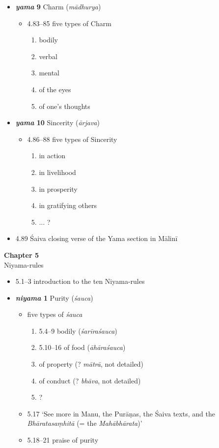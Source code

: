 \documentclass[11pt]{book} %
\newcommand{\skt}[1]{\textit{#1}}
\begin{document}
\begin{itemize}
\item \textbf{\skt{yama} 9}  Charm (\skt{mādhurya})
\begin{itemize}
\item 4.83--85 five types of Charm
            \begin{enumerate}
            \item bodily
            \item verbal
            \item mental
            \item of the eyes
            \item of one's thoughts
            \end{enumerate}
\end{itemize}

\item \textbf{\skt{yama} 10}  Sincerity (\skt{ārjava})
\begin{itemize}
\item 4.86--88 five types of Sincerity
            \begin{enumerate}
            \item in action
            \item in livelihood
            \item in prosperity
            \item in gratifying others
            \item ... ?
            \end{enumerate}
\end{itemize}
\item 4.89 Śaiva closing verse of the Yama section in Mālinī
\end{itemize}

\bigskip
 \textbf{Chapter 5}\\
  Niyama-rules  
\begin{itemize}
\item 5.1--3 introduction to the ten Niyama-rules
\item \textbf{\skt{niyama} 1}  Purity (\skt{śauca})
   \begin{itemize}
    \item  five types of \skt{śauca}
    \begin{enumerate}
    \item 5.4--9 bodily (\skt{śarīraśauca})
    \item 5.10--16 of food (\skt{āhāraśauca})
    \item of property (? \skt{mātrā}, not detailed)
    \item of conduct (? \skt{bhāva}, not detailed)
    \item ?
    \end{enumerate}
    \item 5.17 `See more in Manu, the Purāṇas, the Śaiva texts, and the \textit{Bhāratasaṃhitā} (= the  \textit{Mahābhārata})'
    \item 5.18--21 praise of purity
    \end{itemize}
\end{itemize}
\end{document}
